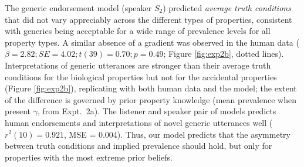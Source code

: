 \documentclass[12pt,letterpaper]{article}
\begin{document}
The generic endorsement model (speaker $S_2$) predicted \emph{average truth conditions} that did not vary appreciably across the different types of properties, consistent with generics being acceptable for a wide range of prevalence levels for all property types.
A similar absence of a gradient was observed in the human data ($\beta = 2.82; SE = 4.02; t(39) = 0.70; p = 0.49$; Figure \ref{fig:exp2b}, dotted lines). 
Interpretations of generic utterances are stronger than their average truth conditions for the biological properties but not for the accidental properties (Figure \ref{fig:exp2b}), replicating  with both human data and the model; the extent of the difference is governed by prior property knowledge (mean prevalence when present $\gamma$, from Expt.~2a).
The listener and speaker pair of models predicts human endorsements and interpretations of novel generic utterances well ($r^2(10) = 0.921$, MSE = 0.004).
Thus, our model predicts that the asymmetry between truth conditions and implied prevalence should hold, but only for properties with the most extreme prior beliefs.
%
\end{document}
